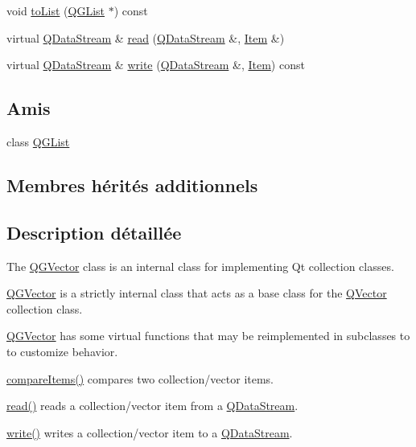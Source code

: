 \begin{DoxyCompactItemize}
\item 
void \hyperlink{class_q_g_vector_ac923e9524dd58b37d20a7205f482cfa5}{to\+List} (\hyperlink{class_q_g_list}{Q\+G\+List} $\ast$) const 
\item 
virtual \hyperlink{class_q_data_stream}{Q\+Data\+Stream} \& \hyperlink{class_q_g_vector_a6ffba6b62053655e2d5aec0138a2e128}{read} (\hyperlink{class_q_data_stream}{Q\+Data\+Stream} \&, \hyperlink{class_q_collection_ac6f3ddbf999e31fb797927f71ae6b5d7}{Item} \&)
\item 
virtual \hyperlink{class_q_data_stream}{Q\+Data\+Stream} \& \hyperlink{class_q_g_vector_a0d42aba51020b6c9caa845da79d4f8a0}{write} (\hyperlink{class_q_data_stream}{Q\+Data\+Stream} \&, \hyperlink{class_q_collection_ac6f3ddbf999e31fb797927f71ae6b5d7}{Item}) const 
\end{DoxyCompactItemize}
\subsection*{Amis}
\begin{DoxyCompactItemize}
\item 
class \hyperlink{class_q_g_vector_a9bfde3c3259271cb86b87bd78b399dd5}{Q\+G\+List}
\end{DoxyCompactItemize}
\subsection*{Membres hérités additionnels}


\subsection{Description détaillée}
The \hyperlink{class_q_g_vector}{Q\+G\+Vector} class is an internal class for implementing Qt collection classes. 

\hyperlink{class_q_g_vector}{Q\+G\+Vector} is a strictly internal class that acts as a base class for the \hyperlink{class_q_vector}{Q\+Vector} collection class.

\hyperlink{class_q_g_vector}{Q\+G\+Vector} has some virtual functions that may be reimplemented in subclasses to to customize behavior.


\begin{DoxyItemize}
\item \hyperlink{class_q_g_vector_a65a79a6de037a4033ead55891622f5e2}{compare\+Items()} compares two collection/vector items. 
\item \hyperlink{class_q_g_vector_a9023b4232fc0b7bd6e8e14f5af5090d8}{read()} reads a collection/vector item from a \hyperlink{class_q_data_stream}{Q\+Data\+Stream}. 
\item \hyperlink{class_q_g_vector_afa5b369ed1cb4752c59fc5c79b9bc1d8}{write()} writes a collection/vector item to a \hyperlink{class_q_data_stream}{Q\+Data\+Stream}. 
\end{DoxyItemize}

